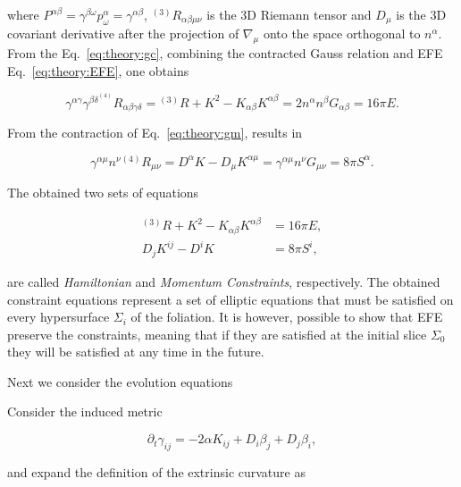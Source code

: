 where $P^{\alpha\beta} = \gamma^{\beta\omega}p_{\omega}^{\alpha} = \gamma^{\alpha\beta}$, 
$^{(3)}R_{\alpha\beta\mu\nu}$ is the 3D Riemann tensor and $D_{\mu}$ is the 3D covariant derivative after 
the projection of $\nabla_{\mu}$ onto the space orthogonal to $n^{\alpha}$.
%
From the Eq.~\eqref{eq:theory:gc}, combining the contracted Gauss relation and \ac{EFE} Eq.~\eqref{eq:theory:EFE}, one obtains 

\begin{equation}
    \gamma^{\alpha\gamma}\gamma^{\beta\delta}^{(4)}R_{\alpha\beta\gamma\delta} = {^{(3)}R} + K^2 - K_{\alpha\beta}K^{\alpha\beta} = 2n^{\alpha}n^{\beta}G_{\alpha\beta} = 16\pi E.
\end{equation}

From the contraction of Eq.~\eqref{eq:theory:gm}, results in

\begin{equation}
    \gamma^{\alpha\mu}n^{\nu}{^{(4)}R_{\mu\nu}} = D^{\alpha}K - D_{\mu}K^{\alpha\mu} = \gamma^{\alpha\mu}n^{\nu}G_{\mu\nu} = 8\pi S^{\alpha}.
\end{equation}

The obtained two sets of equations 

\begin{align}
    {^{(3)}R} + K^2 - K_{\alpha\beta} K^{\alpha\beta} &= 16\pi E, \label{eq:theory:ham_const}\\
    D_j K^{ij} - D^i K &= 8\pi S^i, \label{eq:theory:mom_const}
\end{align}

are called \textit{Hamiltonian} and \textit{Momentum Constraints}, respectively.
%
The obtained constraint equations represent a set of elliptic equations 
that must be satisfied on every hypersurface $\Sigma_i$ of the foliation. 
%
It is however, possible to show that \ac{EFE} preserve the constraints, 
meaning that if they are satisfied at the initial slice $\Sigma_0$ 
they will be satisfied at any time in the future.

Next we consider the evolution equations

Consider the induced metric 

\begin{equation}
    \partial_t\gamma_{ij} = -2\alpha K_{ij} + D_{i}\beta_j + D_j \beta_i,
    \label{eq:theory:evol_metric}
\end{equation}

and expand the definition of the extrinsic curvature as 

